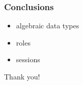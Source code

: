 \documentclass{beamer}
\begin{document}
\begin{frame}
\frametitle{Conclusions}
\begin{itemize}
\item \alert{algebraic data types}
\item roles
\item sessions
\end{itemize}
\end{frame}

\begin{frame}
\centerline{Thank you!}
\note[item]{}
\end{frame}
\end{document}
